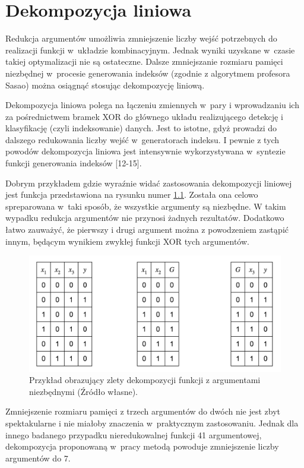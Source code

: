 \chapter{Dekompozycja liniowa}

Redukcja argumentów umożliwia zmniejszenie liczby wejść potrzebnych do realizacji funkcji w~układzie kombinacyjnym.
Jednak wyniki uzyskane w~czasie takiej optymalizacji nie są ostateczne.
Dalsze zmniejszanie rozmiaru pamięci niezbędnej w~procesie generowania indeksów (zgodnie z algorytmem profesora Sasao) można osiągnąć stosując dekompozycję liniową.

Dekompozycja liniowa polega na  łączeniu zmiennych w~pary i wprowadzaniu ich za pośrednictwem bramek XOR do głównego układu realizującego detekcję i klasyfikację (czyli indeksowanie) danych.
Jest to istotne,
gdyż prowadzi do dalszego redukowania liczby wejść w~generatorach indeksu.
I pewnie z tych powodów dekompozycja liniowa jest intensywnie wykorzystywana w~syntezie funkcji generowania indeksów [12-15].

Dobrym przykładem gdzie wyraźnie widać zastosowania dekompozycji liniowej jest funkcja przedstawiona na rysunku numer \ref{fig:required-decomposition}.
Została ona celowo spreparowana w~taki sposób,
że wszystkie argumenty są niezbędne.
W takim wypadku redukcja argumentów nie przynosi żadnych rezultatów.
Dodatkowo łatwo zauważyć,
że pierwszy i drugi argument można z powodzeniem zastąpić innym,
będącym wynikiem zwykłej funkcji XOR tych argumentów.

\begin{figure}[H]
\centering
\includegraphics[width = 13cm]{chapter03/required-decomposition.png}
\caption{Przykład obrazujący zlety dekompozycji funkcji z argumentami niezbędnymi (Źródło własne).}
\label{fig:required-decomposition}
\end{figure}

Zmniejszenie rozmiaru pamięci z trzech argumentów do dwóch nie jest zbyt spektakularne i nie miałoby znaczenia w~praktycznym zastosowaniu.
Jednak dla innego badanego przypadku nieredukowalnej funkcji 41 argumentowej,
dekompozycja proponowaną w~pracy metodą powoduje zmniejszenie liczby argumentów do 7.

